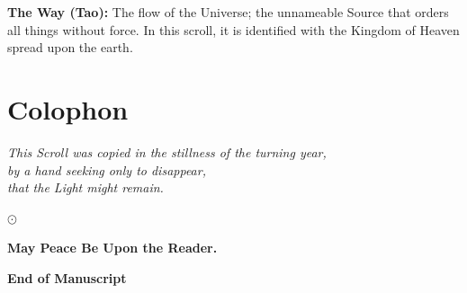 \documentclass[10pt, openright]{book}
\begin{document}
\textbf{The Way (Tao):} The flow of the Universe; the unnameable Source that orders all things without force. In this scroll, it is identified with the Kingdom of Heaven spread upon the earth.

\chapter{Colophon}

\vspace{2cm}

\begin{center}
    \textit{This Scroll was copied in the stillness of the turning year, \\
    by a hand seeking only to disappear, \\
    that the Light might remain.}
    
    \vspace{1cm}
    
    $\odot$
    
    \vspace{1cm}
    
    \textbf{May Peace Be Upon the Reader.}
\end{center}

\vspace{3cm}

\begin{center}
\textbf{End of Manuscript}
\end{center}
\end{document}
